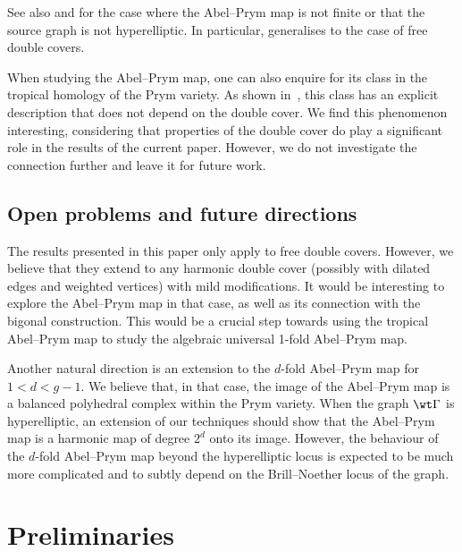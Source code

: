 See also  and  for the case where the Abel--Prym map is not finite or that the source graph is not hyperelliptic. 
\noindent In particular,  generalises 
\cite[Theorem 5.6]{RZ_ngonal} to the case of  free double covers.  

When studying the Abel--Prym map, one can also enquire for its class in the tropical homology of the Prym variety. As shown in~\cite[Theorem 4.25]{RZ_ngonal}, this class has an explicit description that does not depend on the double cover. We find this phenomenon interesting, considering that properties of the double cover do play a significant role in the results of the current paper. However, we do not investigate the connection further and leave it for future work. 

\subsection*{Open problems and future directions}

The results presented in this paper 
only apply to free double covers. However, we believe that they extend to any harmonic double cover (possibly with dilated edges and weighted vertices) with mild modifications. It would 
be  interesting to explore the Abel--Prym map in that case, as well as its connection with the bigonal construction. 
This would be a crucial step towards using the tropical Abel--Prym map to study the algebraic universal 1-fold Abel--Prym map. 

Another natural direction is an extension to the $d$-fold Abel--Prym map for  $1 < d < g-1$. We believe that, in that case, the image of the Abel--Prym map is a balanced polyhedral complex within the Prym variety. When the graph $\wt\Gamma$ is hyperelliptic, an extension of our techniques should show
 that the Abel--Prym map is a harmonic map of degree $2^d$ onto its image. However, the behaviour of the $d$-fold Abel--Prym map beyond the hyperelliptic locus is expected to be much more complicated and to subtly depend  on the Brill--Noether locus of the graph. 

\section{Preliminaries}\label{sec:preliminaries} 


